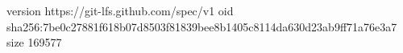 version https://git-lfs.github.com/spec/v1
oid sha256:7be0c27881f618b07d8503f81839bee8b1405c8114da630d23ab9ff71a76e3a7
size 169577
